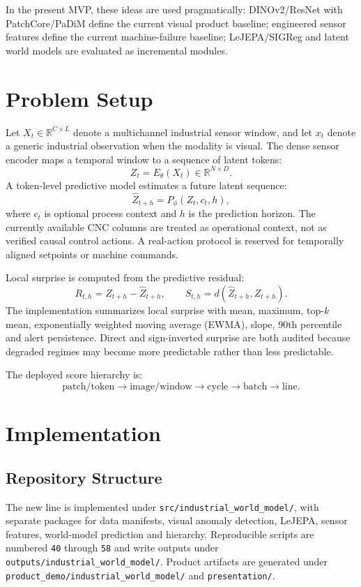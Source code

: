 \documentclass[10pt,conference]{IEEEtran}
\begin{document}
In the present MVP, these ideas are used pragmatically: DINOv2/ResNet with PatchCore/PaDiM define the current visual product baseline; engineered sensor features define the current machine-failure baseline; LeJEPA/SIGReg and latent world models are evaluated as incremental modules.

\section{Problem Setup}
Let $X_t \in \mathbb{R}^{C \times L}$ denote a multichannel industrial sensor window, and let $x_t$ denote a generic industrial observation when the modality is visual. The dense sensor encoder maps a temporal window to a sequence of latent tokens:
\begin{equation}
Z_t = E_\theta(X_t) \in \mathbb{R}^{N \times D}.
\end{equation}
A token-level predictive model estimates a future latent sequence:
\begin{equation}
\hat{Z}_{t+h} = P_\phi(Z_t,c_t,h),
\end{equation}
where $c_t$ is optional process context and $h$ is the prediction horizon. The currently available CNC columns are treated as operational context, not as verified causal control actions. A real-action protocol is reserved for temporally aligned setpoints or machine commands.

Local surprise is computed from the predictive residual:
\begin{equation}
R_{t,h}=Z_{t+h}-\hat{Z}_{t+h}, \qquad
S_{t,h}=d(\hat{Z}_{t+h},Z_{t+h}).
\end{equation}
The implementation summarizes local surprise with mean, maximum, top-$k$ mean, exponentially weighted moving average (EWMA), slope, 90th percentile and alert persistence. Direct and sign-inverted surprise are both audited because degraded regimes may become more predictable rather than less predictable.

The deployed score hierarchy is:
\begin{equation}
\text{patch/token} \rightarrow \text{image/window} \rightarrow \text{cycle} \rightarrow \text{batch} \rightarrow \text{line}.
\end{equation}

\section{Implementation}
\subsection{Repository Structure}
The new line is implemented under \texttt{src/industrial\_world\_model/}, with separate packages for data manifests, visual anomaly detection, LeJEPA, sensor features, world-model prediction and hierarchy. Reproducible scripts are numbered \texttt{40} through \texttt{58} and write outputs under \texttt{outputs/industrial\_world\_model/}. Product artifacts are generated under \texttt{product\_demo/industrial\_world\_model/} and \texttt{presentation/}.
\end{document}
